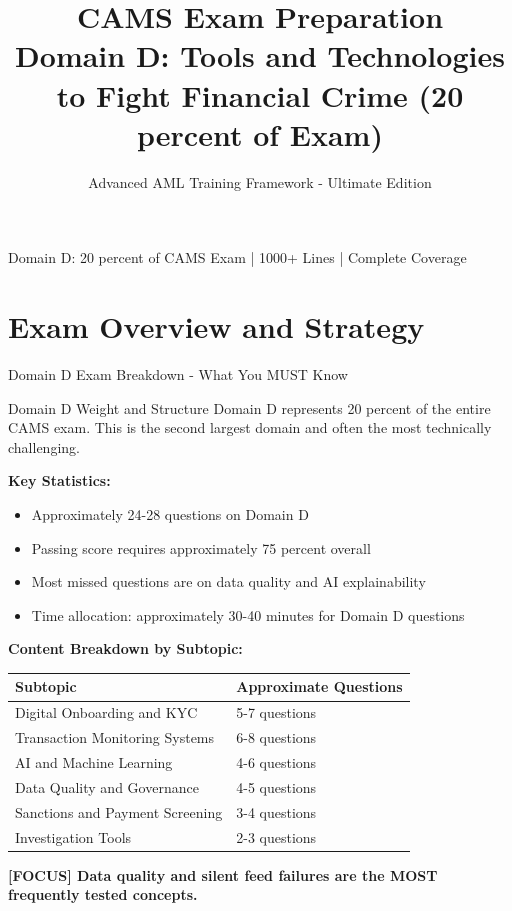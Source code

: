 \documentclass[11pt,a4paper]{beamer}
\title[CAMS Domain D - ULTIMATE DECK]{CAMS Exam Preparation\\\Large Domain D: Tools and Technologies\\to Fight Financial Crime (20 percent of Exam)}
\author{Advanced AML Training Framework - Ultimate Edition}
\date{}
\renewcommand{\tiny}{\fontsize{5pt}{6pt}\selectfont}
\newcommand{\examfocus}[1]{\textcolor{orange!80!black}{\textbf{[FOCUS] #1}}}
\begin{document}
	
	\begin{frame}
		\titlepage
		\centering
		\tiny Domain D: 20 percent of CAMS Exam | 1000+ Lines | Complete Coverage
	\end{frame}
	
	\section{Exam Overview and Strategy}
	
	\begin{frame}{Domain D Exam Breakdown - What You MUST Know}
		\begin{block}{Domain D Weight and Structure}
			Domain D represents 20 percent of the entire CAMS exam. This is the second largest domain and often the most technically challenging.
		\end{block}
		
		\textbf{Key Statistics:}
		\begin{itemize}
			\item Approximately 24-28 questions on Domain D
			\item Passing score requires approximately 75 percent overall
			\item Most missed questions are on data quality and AI explainability
			\item Time allocation: approximately 30-40 minutes for Domain D questions
		\end{itemize}
		
		\textbf{Content Breakdown by Subtopic:}
		\begin{longtable}{p{}|p{0.4\textwidth}}
			\hline
			\rowcolor{lightgray}
			\textbf{Subtopic} & \textbf{Approximate Questions} \\
			\hline
			Digital Onboarding and KYC & 5-7 questions \\
			\hline
			Transaction Monitoring Systems & 6-8 questions \\
			\hline
			AI and Machine Learning & 4-6 questions \\
			\hline
			Data Quality and Governance & 4-5 questions \\
			\hline
			Sanctions and Payment Screening & 3-4 questions \\
			\hline
			Investigation Tools & 2-3 questions \\
			\hline
		\end{longtable}
		
		\examfocus{Data quality and silent feed failures are the MOST frequently tested concepts.}
	\end{frame}
	
\end{document}

